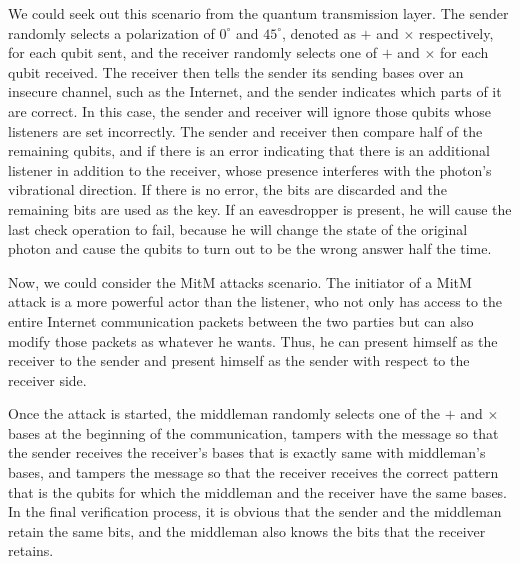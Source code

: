 \documentclass[sigconf]{acmart}
\begin{document}
We could seek out this scenario from the quantum transmission layer. The sender randomly selects a polarization of $0^\circ$ and $45^\circ$, denoted as $+$ and $\times$ respectively, for each qubit sent, and the receiver randomly selects one of $+$ and $\times$ for each qubit received. The receiver then tells the sender its sending bases over an insecure channel, such as the Internet, and the sender indicates which parts of it are correct. In this case, the sender and receiver will ignore those qubits whose listeners are set incorrectly. The sender and receiver then compare half of the remaining qubits, and if there is an error indicating that there is an additional listener in addition to the receiver, whose presence interferes with the photon's vibrational direction. If there is no error, the bits are discarded and the remaining bits are used as the key. If an eavesdropper is present, he will cause the last check operation to fail, because he will change the state of the original photon and cause the qubits to turn out to be the wrong answer half the time.

Now, we could consider the MitM attacks scenario. The initiator of a MitM attack is a more powerful actor than the listener, who not only has access to the entire Internet communication packets between the two parties but can also modify those packets as whatever he wants. Thus, he can present himself as the receiver to the sender and present himself as the sender with respect to the receiver side.

Once the attack is started, the middleman randomly selects one of the $+$ and $\times$ bases at the beginning of the communication, tampers with the message so that the sender receives the receiver's bases that is exactly same with middleman's bases, and tampers the message so that the receiver receives the correct pattern that is the qubits for which the middleman and the receiver have the same bases. In the final verification process, it is obvious that the sender and the middleman retain the same bits, and the middleman also knows the bits that the receiver retains\cite{fei_quantum_2018}.
\end{document}

